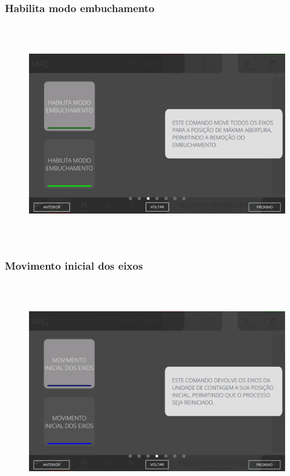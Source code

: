 \newpage
\thispagestyle{fancy}
\vspace*{40 pt}
\subsubsection{\small{Habilita modo embuchamento}}\label{miniTelaComandoContagemHabilitaModoEmbuchamento}
\vspace*{\fill}
\begin{figure}[h]
  \centering
  \includegraphics[width=576px,height=360px]{src/imagesFlexo/08-count/commands/e-3.png}
\end{figure}
\vspace*{\fill}

\newpage
\thispagestyle{fancy}
\vspace*{40 pt}
\subsubsection{\small{Movimento inicial dos eixos}}\label{miniTelaComandoContagemMovimentoInicialDosEixos}
\vspace*{\fill}
\begin{figure}[h]
  \centering
  \includegraphics[width=576px,height=360px]{src/imagesFlexo/08-count/commands/e-4.png}
\end{figure}
\vspace*{\fill}

